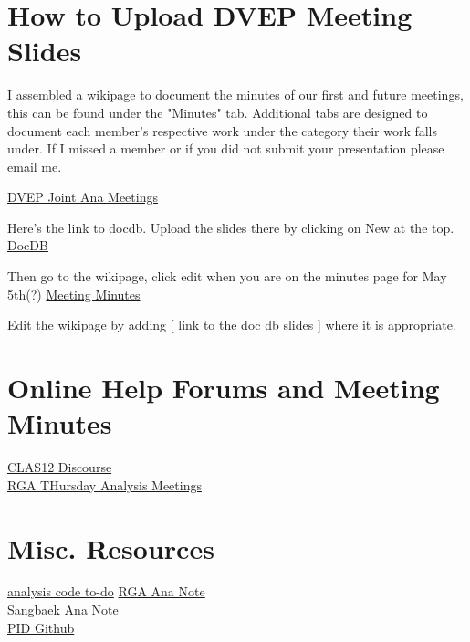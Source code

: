 \section{How to Upload DVEP Meeting Slides}
    I assembled a wikipage to document the minutes of our first and future meetings, this can be found under the "Minutes" tab. Additional tabs are designed to document each member's respective work under the category their work falls under. If I missed a member or if you did not submit your presentation please email me.
    
    \href{https://clasweb.jlab.org/wiki/index.php/DVCS/DVMP_Joint_Analysis_Group#tab=Overview}{DVEP Joint Ana Meetings}
    
    
    Here's the link to docdb. Upload the slides there by clicking on New at the top.
    \href{https://clas12-docdb.jlab.org/cgi-bin/DocDB/private/DocumentDatabase}{DocDB}
    
    Then go to the wikipage, click edit when you are on the minutes page for May 5th(?)
    \href{https://clasweb.jlab.org/wiki/index.php/DVCS/DVMP_Joint_Analysis_Group#tab=Minutes}{Meeting Minutes}
    
    Edit the wikipage by adding
    [ link to the doc db slides ]
    where it is appropriate.
    
\section{Online Help Forums and Meeting Minutes}
    \href{https://clas12.discourse.group/latest}{CLAS12 Discourse}\\
    \href{https://clas12-docdb.jlab.org/cgi-bin/DocDB/private/DisplayMeeting?conferenceid=9}{RGA THursday Analysis Meetings}
    
    
    
\section{Misc. Resources}

    \href{https://github.com/robertej19/analysis_code/projects/1}{analysis code to-do}
    \href{https://www.overleaf.com/project/5ea737720942930001ff5e9c}{RGA Ana Note}\\
    \href{https://www.overleaf.com/project/5f8a6c3689df1e0001ce708c}{Sangbaek Ana Note}\\
    \href{https://github.com/drewkenjo/analysis_code/blob/master/pid/electron/Electron.groovy}{PID Github}
 